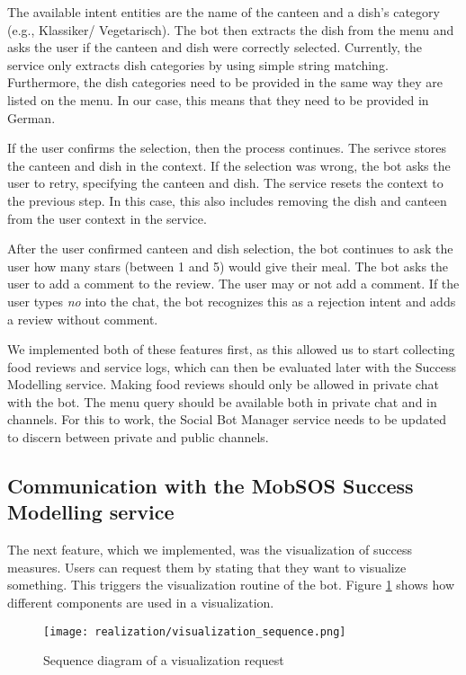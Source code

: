 The available intent entities are the name of the canteen and a dish's category (e.g., Klassiker/ Vegetarisch).
The bot then extracts the dish from the menu and asks the user if the canteen and dish were correctly selected. 
Currently, the service only extracts dish categories by using simple string matching. Furthermore, the dish categories need to be provided in the same way they are listed on the menu. In our case, this means that they need to be provided in German.

If the user confirms the selection, then the process continues. 
The serivce stores the canteen and dish in the context. 
If the selection was wrong, the bot asks the user to retry, specifying the canteen and dish. 
The service resets the context to the previous step. In this case, this also includes removing the dish and canteen from the user context in the service.

After the user confirmed canteen and dish selection, the bot continues to ask the user how many stars (between 1 and 5) would give their meal. 
The bot asks the user to add a comment to the review. The user may or not add a comment. If the user types \emph{no} into the chat, the bot recognizes this as a rejection intent and adds a review without comment.

We implemented both of these features first, as this allowed us to start collecting food reviews and service logs, which can then be evaluated later with the Success Modelling service.
Making food reviews should only be allowed in private chat with the bot. 
The menu query should be available both in private chat and in channels.
For this to work, the Social Bot Manager service needs to be updated to discern between private and public channels.

\subsection{Communication with the MobSOS Success Modelling service}
The next feature, which we implemented, was the visualization of success measures. Users can request them by stating that they want to visualize something.
This triggers the visualization routine of the bot. Figure \ref{fig:visualReqSeq} shows how different components are used in a visualization.
\begin{figure}[h]
    \centering
    \texttt{[image: realization/visualization\_sequence.png]}
    \caption{Sequence diagram of a visualization request}
    \label{fig:visualReqSeq}
\end{figure}

